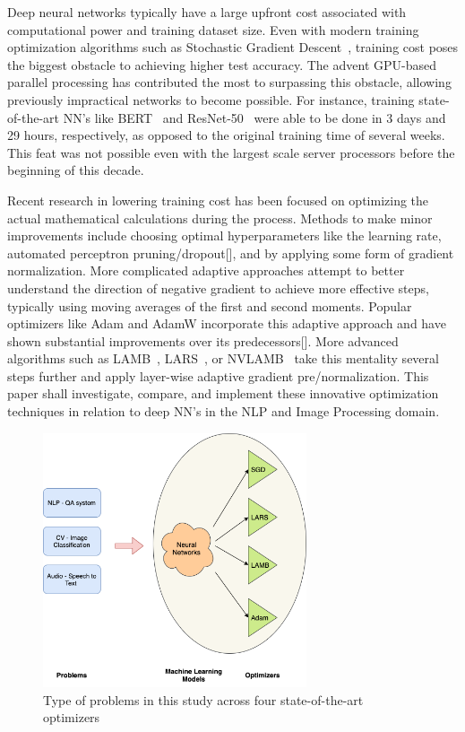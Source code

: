 Deep neural networks typically have a large upfront cost associated with computational power and training dataset size. Even with modern training optimization algorithms such as Stochastic Gradient Descent~\cite{SGD}, training cost poses the biggest obstacle to achieving higher test accuracy. The advent GPU-based parallel processing has contributed the most to surpassing this obstacle, allowing previously impractical networks to become possible. For instance, training state-of-the-art NN's like BERT~\cite{bert} and ResNet-50~\cite{resnet} were able to be done in 3 days and 29 hours, respectively, as opposed to the original training time of several weeks. This feat was not possible even with the largest scale server processors before the beginning of this decade. 

Recent research in lowering training cost has been focused on optimizing the actual mathematical calculations during the process. Methods to make minor improvements include choosing optimal hyperparameters like the learning rate, automated perceptron pruning/dropout[], and by applying some form of gradient normalization. More complicated adaptive approaches attempt to better understand the direction of negative gradient to achieve more effective steps, typically using moving averages of the first and second moments. Popular optimizers like Adam and AdamW incorporate this adaptive approach and have shown substantial improvements over its predecessors[]. More advanced algorithms such as LAMB~\cite{You2020Large}, LARS~\cite{qian2020impact, ginsburg2018large}, or NVLAMB~\cite{nvidia_nvlamb}  take this mentality several steps further and apply layer-wise adaptive gradient pre/normalization. This paper shall investigate, compare, and implement these innovative optimization techniques in relation to deep NN's in the NLP and Image Processing domain. 

\begin{figure}[!t]
    \centering
    \includegraphics[width=\linewidth, height=7.5cm]{img/dl_optimizers.png}
    \caption{Type of problems in this study across four state-of-the-art optimizers}
    \label{fig:study}
    \vspace{-10pt}
\end{figure}

